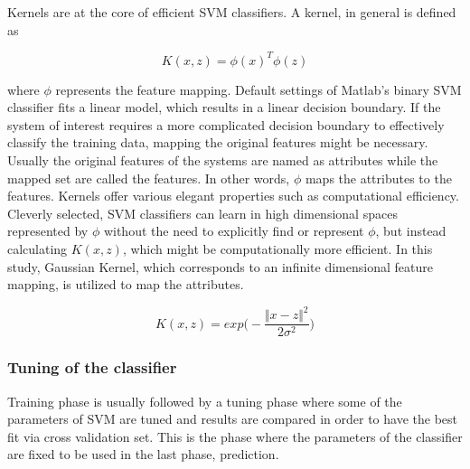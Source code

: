 
Kernels are at the core of efficient SVM classifiers. A kernel, in general is defined as

\begin{equation}
K (x,z) = {\phi(x)}^T \phi(z)
\end{equation}

where $\phi$ represents the feature mapping. 
Default settings of Matlab's binary SVM classifier fits a linear model, which results in a linear decision boundary. 
If the system of interest requires a more complicated decision boundary to effectively classify the training data, mapping the original features might be necessary. 
Usually the original features of the systems are named as attributes while the mapped set are called the features. 
In other words, $\phi$ maps the attributes to the features. Kernels offer various elegant properties such as computational efficiency. 
Cleverly selected, SVM classifiers can learn in high dimensional spaces represented by $\phi$ without the need to explicitly find or represent $\phi$, but instead calculating $K(x,z)$, which might be computationally more efficient. 
In this study, Gaussian Kernel, which corresponds to an infinite dimensional feature mapping, is utilized to map the attributes.

\begin{equation}
K (x,z) = exp \bigg(-\frac{\Vert x - z \Vert ^ 2}{2 \sigma^2} \bigg)
\end{equation}

\subsubsection{Tuning of the classifier}

Training phase is usually followed by a tuning phase where some of the parameters of SVM are tuned and results are compared in order to have the best fit via cross validation set. This is the phase where the parameters of the classifier are fixed to be used in the last phase, prediction.

